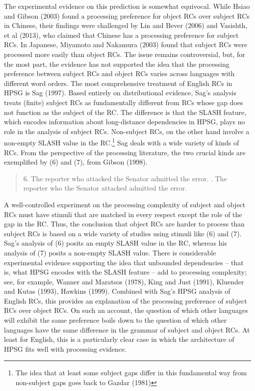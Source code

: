 \documentclass[a4paper]{article}
\begin{document}
\newline
\newline
The experimental evidence on this prediction is somewhat equivocal.  While Hsiao and Gibson (2003) found a processing preference for object RCs over subject RCs in Chinese, their findings were challenged by Lin and Bever (2006) and Vasishth, et al (2013), who claimed that Chinese has a processing preference for subject RCs.  In Japanese, Miyamoto and Nakamura (2003) found that subject RCs were processed more easily than object RCs.  The issue remains controversial, but, for the most part, the evidence has not supported the idea that the processing preference between subject RCs and object RCs varies across languages with different word orders.
\newline
\newline
The most comprehensive treatment of English RCs in HPSG is Sag (1997). Based entirely on distributional evidence, Sag's analysis treats (finite) subject RCs as fundamentally different from RCs whose gap does not function as the subject of the RC.  The difference is that the SLASH feature, which encodes information about long-distance dependencies in HPSG, plays no role in the analysis of subject RCs.  Non-subject RCs, on the other hand involve a non-empty SLASH value in the RC.\footnote{The idea that at least some subject gaps differ in this fundamental way from non-subject gaps goes back to Gazdar (1981)}   
\newline
\newline
Sag deals with a wide variety of kinds of RCs. From the perspective of the processing literature, the two crucial kinds are exemplified by (6) and (7), from Gibson (1998).
\begin{quote}
6. The reporter who attacked the Senator admitted the error.
. The reporter who the Senator attacked admitted the error.
\end{quote}
A well-controlled experiment on the processing complexity of subject and object RCs must have stimuli that are matched in every respect except the role of the gap in the RC.  Thus, the conclusion that object RCs are harder to process than subject RCs is based on a wide variety of studies using stimuli like (6) and (7).  Sag's analysis of (6) posits an empty SLASH value in the RC, whereas his analysis of (7) posits a non-empty SLASH value.  
\newline
\newline
There is considerable experimental evidence supporting the idea that unbounded dependencies -- that is, what HPSG encodes with the SLASH feature -- add to processing complexity; see, for example, Wanner and Maratsos (1978), King and Just (1991), Kluender and Kutas (1993), Hawkins (1999).  Combined with Sag's HPSG analysis of English RCs, this provides an explanation of the processing preference of subject RCs over object RCs.  On such an account, the question of which other languages will exhibit the same preference boils down to the question of which other languages have the same difference in the grammar of subject and object RCs.  At least for English, this is a particularly clear case in which the architecture of HPSG fits well with processing evidence.
\end{document}
